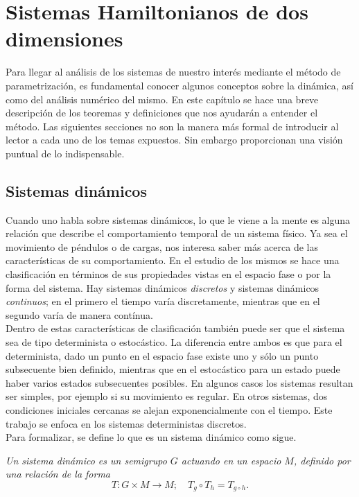 \chapter{Sistemas Hamiltonianos de dos dimensiones}
Para llegar al análisis de los sistemas de nuestro interés mediante el método de parametrización, es fundamental conocer algunos conceptos sobre la dinámica, así como del análisis numérico del mismo. En este capítulo se hace una breve descripción de los teoremas y definiciones que nos ayudarán a entender el método. Las siguientes secciones no son la manera más formal de introducir al lector a cada uno de los temas expuestos. Sin embargo proporcionan una visión puntual de lo indispensable. 

\section{Sistemas dinámicos}
Cuando uno habla sobre sistemas dinámicos, lo que le viene a la mente es alguna relación que describe el comportamiento temporal de un sistema físico. Ya sea el movimiento de péndulos o de cargas, nos interesa saber más acerca de las características de su comportamiento. 
En el estudio de los mismos se hace una clasificación en términos de sus propiedades vistas en el espacio fase o por la forma del sistema. Hay sistemas dinámicos \textit{discretos} y sistemas dinámicos \textit{continuos}; en el primero el tiempo varía discretamente, mientras que en el segundo varía de manera contínua. \\

 Dentro de estas características de clasificación también puede ser que el sistema sea de tipo determinista o estocástico. La diferencia entre ambos es que para el determinista, dado un punto en el espacio fase existe uno y sólo un punto subsecuente bien definido, mientras que en el estocástico para un estado puede haber varios estados subsecuentes posibles.
En algunos casos los sistemas resultan ser simples, por ejemplo si su mo\-vi\-mien\-to es regular. En otros sistemas, dos condiciones iniciales cercanas se alejan ex\-po\-nen\-cial\-men\-te con el tiempo. Este trabajo se enfoca en los  sistemas deterministas discretos.\\

Para formalizar, se define lo que es un sistema dinámico como sigue.  \\
\begin{defini}
\textit{Un sistema dinámico es un semigrupo $G$ actuando en un espacio $M$, definido por una relación de la forma}
\begin{equation}
T : G \times M \rightarrow M; \quad
T_{g}\circ T_{h}=T_{g\circ h} . \label{def sistema dinamico}
\end{equation}
\end{defini}

